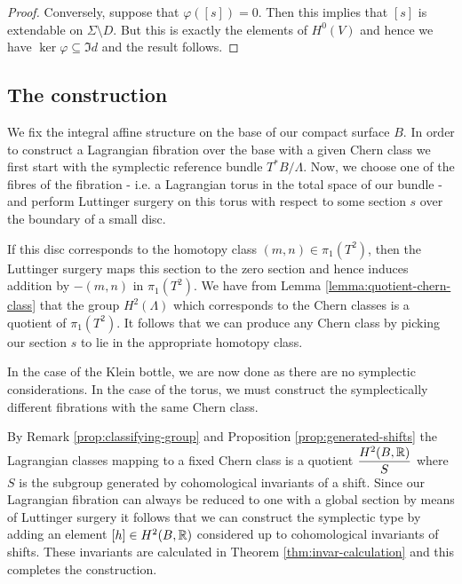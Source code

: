 \begin{proof}
    Conversely, suppose that $\varphi([s]) = 0$. Then this implies that $[s]$ is
    extendable on $\Sigma\setminus D$. But this is exactly the elements of $H^0(V)$
    and hence we have $\ker \varphi \subseteq \Im d$ and the result follows.
\end{proof}

\subsection{The construction}
We fix the integral affine structure on the base of our compact surface $B$. In
order to construct a Lagrangian fibration over the base with a given Chern
class we first start with the symplectic reference bundle $T^*B/\Lambda$. Now,
we choose one of the fibres of the fibration - i.e. a Lagrangian torus in the
total space of our bundle - and perform Luttinger surgery on this torus with
respect to some section $s$ over the boundary of a small disc.

If this disc corresponds to the homotopy class $(m,n) \in \pi_1(T^2)$, then the
Luttinger surgery maps this section to the zero section and hence induces
addition by $-(m,n)$ in $\pi_1(T^2)$. We have from Lemma
\ref{lemma:quotient-chern-class} that the group $H^2(\Lambda)$ which
corresponds to the Chern classes is a quotient of $\pi_1(T^2)$. It follows that
we can produce any Chern class by picking our section $s$ to lie in the
appropriate homotopy class.

In the case of the Klein bottle, we are now done as there are no symplectic
considerations. In the case of the torus, we must construct the symplectically
different fibrations with the same Chern class.

By Remark \ref{prop:classifying-group} and Proposition
\ref{prop:generated-shifts} the Lagrangian classes mapping to a fixed Chern
class is a quotient $\dfrac{H^2(B, \mathbb{R})}{S}$ where $S$ is the subgroup generated
by cohomological invariants of a shift. Since our Lagrangian fibration can
always be reduced to one with a global section by means of Luttinger surgery it
follows that we can construct the symplectic type by adding an element $[h] \in
    H^2(B, \mathbb{R})$ considered up to cohomological invariants of shifts. These
invariants are calculated in Theorem \ref{thm:invar-calculation} and this
completes the construction.
